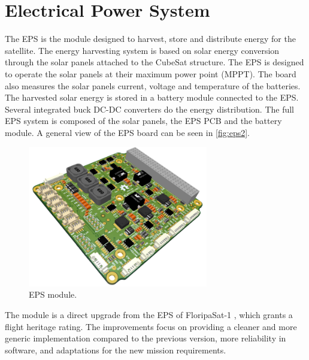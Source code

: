 \section{Electrical Power System}

The EPS is the module designed to harvest, store and distribute energy for the satellite. The energy harvesting system is based on solar energy conversion through the solar panels attached to the CubeSat structure. The EPS is designed to operate the solar panels at their maximum power point (MPPT). The board also measures the solar panels current, voltage and temperature of the batteries. The harvested solar energy is stored in a battery module connected to the EPS. Several integrated buck DC-DC converters do the energy distribution. The full EPS system is composed of the solar panels, the EPS PCB and the battery module. A general view of the EPS board can be seen in \autoref{fig:eps2}.

\begin{figure}[!ht]
    \begin{center}
        \includegraphics[width=0.7\textwidth]{figures/eps2-pcb-3d}
        \caption{EPS module.}
        \label{fig:eps2}
    \end{center}
\end{figure}

The module is a direct upgrade from the EPS of FloripaSat-1 \cite{floripasat}, which grants a flight heritage rating. The improvements focus on providing a cleaner and more generic implementation compared to the previous version, more reliability in software, and adaptations for the new mission requirements.

